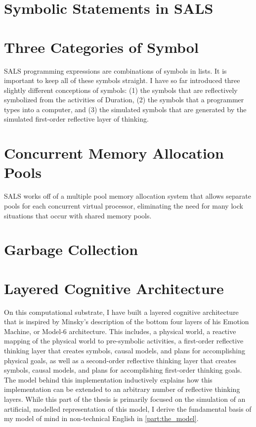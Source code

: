 \section{Symbolic Statements in SALS}

\section{Three Categories of Symbol}

SALS programming expressions are combinations of symbols in lists.
It is important to keep all of these symbols straight.  I have so far
introduced three slightly different conceptions of symbols: (1) the
symbols that are reflectively symbolized from the activities of
Duration, (2) the symbols that a programmer types into a computer, and
(3) the simulated symbols that are generated by the simulated
first-order reflective layer of thinking.

\section{Concurrent Memory Allocation Pools}

SALS works off of a multiple pool memory allocation system that
allows separate pools for each concurrent virtual processor,
eliminating the need for many lock situations that occur with shared
memory pools.

\section{Garbage Collection}



\section{Layered Cognitive Architecture}

On this computational substrate, I have built a layered cognitive
architecture that is inspired by Minsky's description of the bottom
four layers of his Emotion Machine, or Model-6 architecture.  This
includes, a physical world, a reactive mapping of the physical world
to pre-symbolic activities, a first-order reflective thinking layer
that creates symbols, causal models, and plans for accomplishing
physical goals, as well as a second-order reflective thinking layer
that creates symbols, causal models, and plans for accomplishing
first-order thinking goals.  The model behind this implementation
inductively explains how this implementation can be extended to an
arbitrary number of reflective thinking layers.  While this part of
the thesis is primarily focused on the simulation of an artificial,
modelled representation of this model, I derive the fundamental basis
of my model of mind in non-technical English in
\autoref{part:the_model}.

